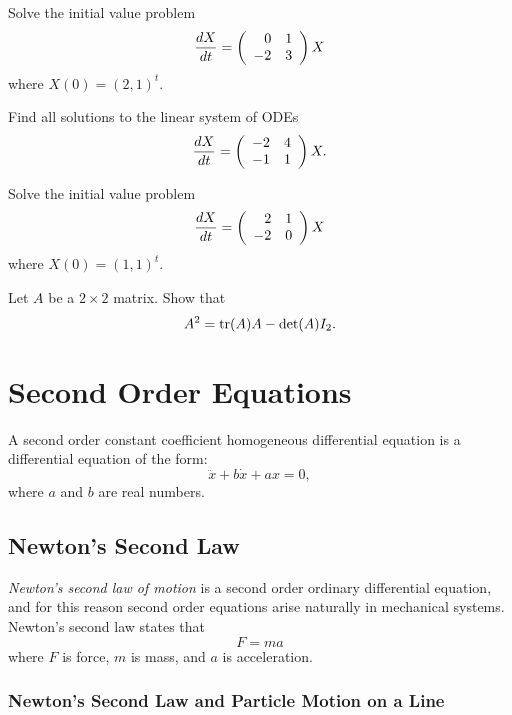 \begin{exercise} \label{c6.6.2}
Solve the initial value problem
\[
\frac{dX}{dt} = \left(\begin{array}{rr} 0 & 1\\ -2 &3\end{array}\right) X
\]
where $X(0)=(2,1)^t$.
\end{exercise}

\begin{exercise} \label{c6.6.3}
Find all solutions to the linear system of ODEs
\[
\frac{dX}{dt} = \left(\begin{array}{rr} -2 & 4\\ -1 &1\end{array}\right) X.
\]
\end{exercise}

\begin{exercise} \label{c6.6.4}
Solve the initial value problem
\[
\frac{dX}{dt} =  \left(\begin{array}{rr} 2 & 1\\ -2 &0\end{array}\right)X
\]
where $X(0)=(1,1)^t$.
\end{exercise}

\begin{exercise}  \label{c6.CH}
Let $A$ be a $2\times 2$ matrix.  Show that
\[
A^2 = {\rm tr}(A)A-\det(A)I_2.
\]
\end{exercise}



\section{Second Order Equations}  \label{S:SOE}

A second order constant coefficient
homogeneous differential equation
is a differential equation of the form:
\begin{equation} \label{eq:soex1}
\ddot{x} + b\dot{x} + ax = 0,
\end{equation}
where $a$ and $b$ are real numbers.

\subsection*{Newton's Second Law}

{\em Newton's second law of motion\/} is a second order ordinary
differential equation, and for this reason second order equations arise
naturally in mechanical systems.  Newton's second law states that
\begin{equation}  \label{e:2ndlaw}
F=ma
\end{equation}
where $F$ is force, $m$ is mass,
and $a$ is acceleration.

\subsubsection*{Newton's Second Law and Particle Motion on a Line}

